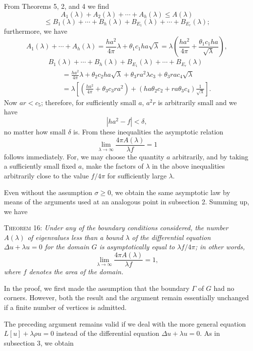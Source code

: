 From Theorems 5, 2, and 4 we find
\[
A_1(\lambda)+A_2(\lambda)+\cdots+A_h(\lambda)\le A(\lambda)
\]
\[
\le B_1(\lambda)+\cdots+B_h(\lambda)+B_{E_1}(\lambda)+\cdots+B_{E_r}(\lambda);
\]
furthermore, we have
\[
A_1(\lambda)+\cdots+A_h(\lambda)
=\frac{ha^2}{4\pi}\lambda+\theta_1c_1ha\sqrt\lambda
=\lambda\left(\frac{ha^2}{4\pi}+\frac{\theta_1c_1ha}{\sqrt\lambda}\right),
\]
\begin{align*}
&B_1(\lambda)+\cdots+B_h(\lambda)+B_{E_1}(\lambda)+\cdots+B_{E_r}(\lambda)\\
&\qquad=\frac{ha^2}{4\pi}\lambda+\theta_2c_2ha\sqrt\lambda
+\theta_3ra^2\lambda c_3+\theta_3rac_4\sqrt\lambda\\
&\qquad=\lambda\left[\left(\frac{ha^2}{4\pi}+\theta_3c_3ra^2\right)
+\left(ha\theta_2c_2+ra\theta_3c_4\right)\frac1{\sqrt\lambda}\right].
\end{align*}
Now $ar<c_5$; therefore, for sufficiently small $a$, $a^2r$ is arbitrarily small and we have
\[
|ha^2-f|<\delta,
\]
no matter how small $\delta$ is. From these inequalities the asymptotic relation
\[
\lim_{\lambda\to\infty}\frac{4\pi A(\lambda)}{\lambda f}=1
\]
follows immediately. For, we may choose the quantity $a$ arbitrarily, and by taking a sufficiently small fixed $a$, make the factors of $\lambda$ in the above inequalities arbitrarily close to the value $f/4\pi$ for sufficiently large $\lambda$.

Even without the assumption $\sigma\ge0$, we obtain the same asymptotic law by means of the arguments used at an analogous point in subsection 2. Summing up, we have

\textsc{Theorem 16:} \emph{Under any of the boundary conditions considered, the number $A(\lambda)$ of eigenvalues less than a bound $\lambda$ of the differential equation $\Delta u+\lambda u=0$ for the domain $G$ is asymptotically equal to $\lambda f/4\pi$; in other words,}
\begin{equation}\tag{34}
\lim_{\lambda\to\infty}\frac{4\pi A(\lambda)}{\lambda f}=1,
\end{equation}
\emph{where $f$ denotes the area of the domain.}

In the proof, we first made the assumption that the boundary $\Gamma$ of $G$ had no corners. However, both the result and the argument remain essentially unchanged if a finite number of vertices is admitted.

The preceding argument remains valid if we deal with the more general equation $L[u]+\lambda\rho u=0$ instead of the differential equation $\Delta u+\lambda u=0$. As in subsection 3, we obtain

